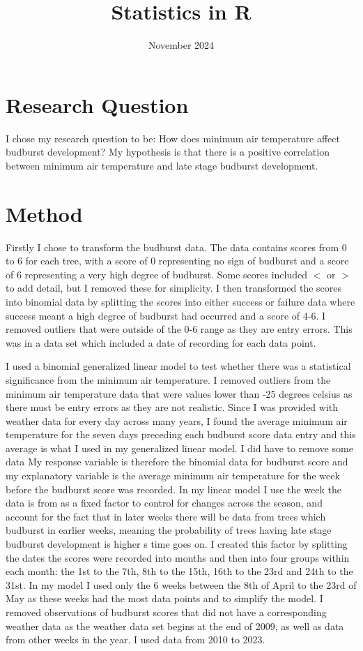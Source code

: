 \documentclass{article}
\title{Statistics in R}
\date{November 2024}
\begin{document}
\maketitle
\section{Research Question}
I chose my research question to be: How does minimum air temperature affect budburst development? My hypothesis is that there is a positive correlation between minimum air temperature and late stage budburst development.
\section{Method}
 Firstly I chose to transform the budburst data. The data contains scores from 0 to 6 for each tree, with a score of 0 representing no sign of budburst and a score of 6 representing a very high degree of budburst. Some scores included $<$ or $>$ to add detail, but I removed these for simplicity. I then transformed the scores into binomial data by splitting the scores into either success or failure data where success meant a high degree of budburst had occurred and a score of 4-6. I removed outliers that were outside of the 0-6 range as they are entry errors. This was in a data set which included a date of recording for each data point.
 
 I used a binomial generalized linear model to test whether there was a statistical significance from the minimum air temperature. I removed outliers from the minimum air temperature data that were values lower than -25 degrees celsius as there must be entry errors as they are not realistic. Since I was provided with weather data for every day across many years, I found the average minimum air temperature for the seven days preceding each budburst score data entry and this average is what I used in my generalized linear model. I did have to remove some data My response variable is therefore the binomial data for budburst score and my explanatory variable is the average minimum air temperature for the week before the budburst score was recorded. In my linear model I use the week the data is from as a fixed factor to control for changes across the season, and account for the fact that in later weeks there will be data from trees which budburst in earlier weeks, meaning the probability of trees having late stage budburst development is higher s time goes on. I created this factor by splitting the dates the scores were recorded into months and then into four groups within each month: the 1st to the 7th, 8th to the 15th, 16th to the 23rd and 24th to the 31st. In my model I used only the 6 weeks between the 8th of April to the 23rd of May as these weeks had the most data points and to simplify the model. I removed observations of budburst scores that did not have a corresponding weather data as the weather data set begins at the end of 2009, as well as data from other weeks in the year. I used data from 2010 to 2023.
\end{document}
